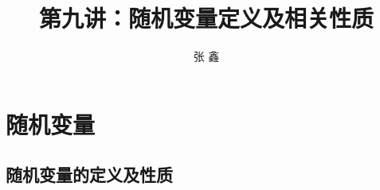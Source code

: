 \documentclass[Prob-All.tex]{subfiles}
\begin{document}
\setcounter{section}{1}
\section{随机变量}
\title [概率论]{第九讲：随机变量定义及相关性质}
\author [张鑫 {\rm Email: xzhangseu@seu.edu.cn} ]{\large 张 鑫}
\date{}



{ 
	\begin{frame}
		\titlepage
	\end{frame}
}

\addtocounter{framenumber}{-3}  %

\subsection{随机变量的定义及性质}
\end{document}
